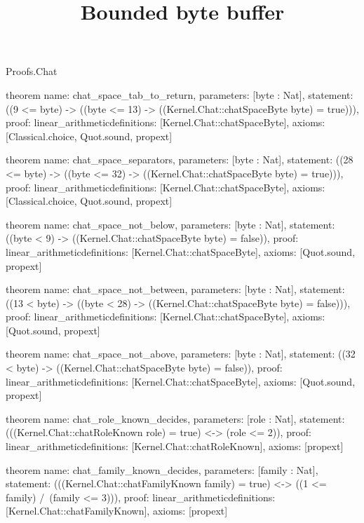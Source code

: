 \begin{lexlean}{Proofs.Chat}
\title{Bounded byte buffer}
\begin{semanticmodule}
theorem{
  name: chat_space_tab_to_return,
  parameters: [byte : Nat],
  statement: ((9 <= byte) -> ((byte <= 13) -> ((Kernel.Chat::chatSpaceByte byte) = true))),
  proof: linear_arithmetic{definitions: [Kernel.Chat::chatSpaceByte]},
  axioms: [Classical.choice, Quot.sound, propext]
}

theorem{
  name: chat_space_separators,
  parameters: [byte : Nat],
  statement: ((28 <= byte) -> ((byte <= 32) -> ((Kernel.Chat::chatSpaceByte byte) = true))),
  proof: linear_arithmetic{definitions: [Kernel.Chat::chatSpaceByte]},
  axioms: [Classical.choice, Quot.sound, propext]
}

theorem{
  name: chat_space_not_below,
  parameters: [byte : Nat],
  statement: ((byte < 9) -> ((Kernel.Chat::chatSpaceByte byte) = false)),
  proof: linear_arithmetic{definitions: [Kernel.Chat::chatSpaceByte]},
  axioms: [Quot.sound, propext]
}

theorem{
  name: chat_space_not_between,
  parameters: [byte : Nat],
  statement: ((13 < byte) -> ((byte < 28) -> ((Kernel.Chat::chatSpaceByte byte) = false))),
  proof: linear_arithmetic{definitions: [Kernel.Chat::chatSpaceByte]},
  axioms: [Quot.sound, propext]
}

theorem{
  name: chat_space_not_above,
  parameters: [byte : Nat],
  statement: ((32 < byte) -> ((Kernel.Chat::chatSpaceByte byte) = false)),
  proof: linear_arithmetic{definitions: [Kernel.Chat::chatSpaceByte]},
  axioms: [Quot.sound, propext]
}

theorem{
  name: chat_role_known_decides,
  parameters: [role : Nat],
  statement: (((Kernel.Chat::chatRoleKnown role) = true) <-> (role <= 2)),
  proof: linear_arithmetic{definitions: [Kernel.Chat::chatRoleKnown]},
  axioms: [propext]
}

theorem{
  name: chat_family_known_decides,
  parameters: [family : Nat],
  statement: (((Kernel.Chat::chatFamilyKnown family) = true) <-> ((1 <= family) /\ (family <= 3))),
  proof: linear_arithmetic{definitions: [Kernel.Chat::chatFamilyKnown]},
  axioms: [propext]
}
\end{semanticmodule}
\end{lexlean}
